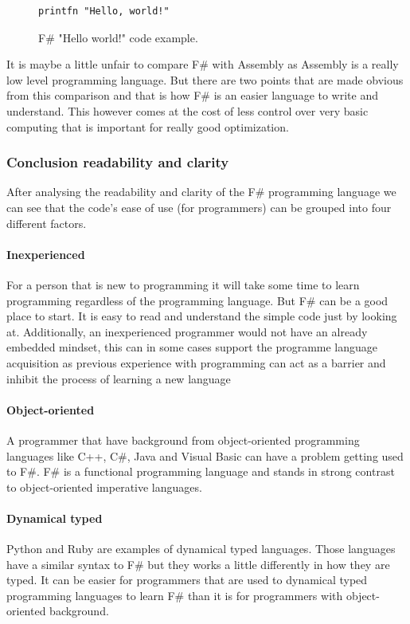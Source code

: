 \documentclass[12pt, a4paper]{article}
\begin{document}
\begin{figure}[!h]
	\begin{lstlisting}
printfn "Hello, world!"
	\end{lstlisting}
	\caption{F\# "Hello world!" code example.}
	\label{fig:fSharpHelloWorld}
\end{figure}

It is maybe a little unfair to compare F\# with Assembly as Assembly is a really low level programming language. But there are two points that are made obvious from this comparison and that is how F\# is an easier language to write and understand. This however comes at the cost of less control over very basic computing that is important for really good optimization.

\newpage


\subsubsection{Conclusion readability and clarity}

After analysing the readability and clarity of the F\# programming language we can see that the code's ease of use (for programmers) can be grouped into four different factors.

\paragraph{Inexperienced}
For a person that is new to programming it will take some time to learn programming regardless of the programming language. But F\# can be a good place to start. It is easy to read and understand the simple code just by looking at. Additionally, an inexperienced programmer would not have an already embedded mindset, this can in some cases support the programme language acquisition as previous experience with programming can act as a barrier and inhibit the process of learning a new language

\paragraph{Object-oriented}
A programmer that have background from object-oriented programming languages like C++, C\#, Java and Visual Basic can have a problem getting used to F\#. F\# is a functional programming language and stands in strong contrast to object-oriented imperative languages.

\paragraph{Dynamical typed}
Python and Ruby are examples of dynamical typed languages. Those languages have a similar syntax to F\# but they works a little differently in how they are typed. It can be easier for programmers that are used to dynamical typed programming languages to learn F\# than it is for programmers with object-oriented background.  
\end{document}
